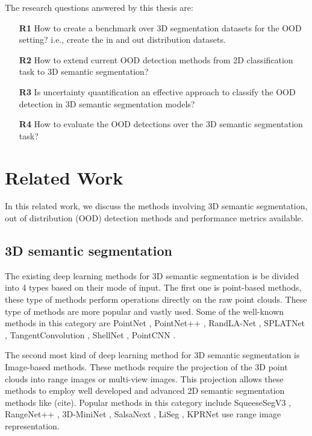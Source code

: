 \documentclass[thesis]{mas_proposal}
\begin{document}
The research questions answered by this thesis are:
\begin{itemize}
    \item[\textbf{R1}] How to create a benchmark over 3D segmentation datasets for the OOD setting? i.e., create the in and out distribution datasets.
    \item[\textbf{R2}] How to extend current OOD detection methods from 2D classification task to 3D semantic segmentation?
    \item[\textbf{R3}] Is uncertainty quantification an effective approach to classify the OOD detection in 3D semantic segmentation models?
    \item[\textbf{R4}] How to evaluate the OOD detections over the 3D semantic segmentation task?
\end{itemize}
\section{Related Work}
In this related work, we discuss the methods involving 3D semantic segmentation, out of distribution (OOD) detection methods and performance metrics available.

\subsection{3D semantic segmentation}
The existing deep learning methods for 3D semantic segmentation is be divided into 4 types based on their mode of input.
The first one is point-based methods, these type of methods perform operations directly on the raw point clouds. 
These type of methods are more popular and vastly used.
Some of the well-known methods in this category are PointNet \cite{Qi_2017_CVPR_pointnet}, PointNet++ \cite{qi2017pointnet++}, RandLA-Net \cite{Hu_2020_CVPR_Randla}, SPLATNet \cite{Su_2018_CVPR_splatnet}, TangentConvolution \cite{Tatarchenko_2018_CVPR_tangconv}, ShellNet \cite{Zhang_2019_ICCV_shellnet}, PointCNN \cite{li2018pointcnn}.

The second most kind of deep learning method for 3D semantic segmentation is Image-based methods.
These methods require the projection of the 3D point clouds into range images or multi-view images. 
This projection allows these methods to employ well developed and advanced 2D semantic segmentation methods like (cite).
Popular methods in this category include SqueeseSegV3 \cite{Sequesesegv3_2018}, RangeNet++ \cite{Milioto2019}, 3D-MiniNet \cite{3Dmininet}, SalsaNext \cite{SalsaNext_2020}, LiSeg \cite{liseg}, KPRNet \cite{kochanov2020kprnet} use range image representation.
\end{document}
